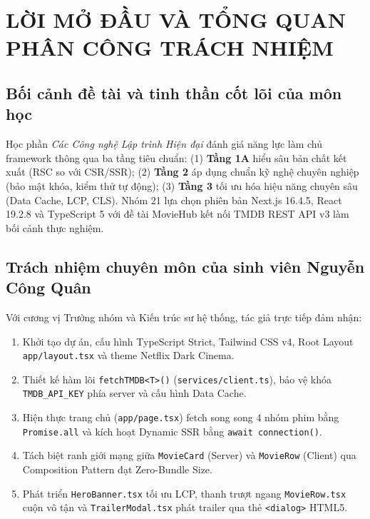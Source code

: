\documentclass[12pt,a4paper]{extarticle}
\begin{document}
\newpage

\section{LỜI MỞ ĐẦU VÀ TỔNG QUAN PHÂN CÔNG TRÁCH NHIỆM}

\subsection{Bối cảnh đề tài và tinh thần cốt lõi của môn học}
Học phần \textit{Các Công nghệ Lập trình Hiện đại} đánh giá năng lực làm chủ framework thông qua ba tầng tiêu chuẩn: (1) \textbf{Tầng 1A} hiểu sâu bản chất kết xuất (RSC so với CSR/SSR); (2) \textbf{Tầng 2} áp dụng chuẩn kỹ nghệ chuyên nghiệp (bảo mật khóa, kiểm thử tự động); (3) \textbf{Tầng 3} tối ưu hóa hiệu năng chuyên sâu (Data Cache, LCP, CLS). Nhóm 21 lựa chọn phiên bản Next.js 16.4.5, React 19.2.8 và TypeScript 5 với đề tài MovieHub kết nối TMDB REST API v3 làm bối cảnh thực nghiệm.

\subsection{Trách nhiệm chuyên môn của sinh viên Nguyễn Công Quân}
Với cương vị Trưởng nhóm và Kiến trúc sư hệ thống, tác giả trực tiếp đảm nhận:
\begin{enumerate}
    \item Khởi tạo dự án, cấu hình TypeScript Strict, Tailwind CSS v4, Root Layout \texttt{app/layout.tsx} và theme Netflix Dark Cinema.
    \item Thiết kế hàm lõi \texttt{fetchTMDB<T>()} (\texttt{services/client.ts}), bảo vệ khóa \texttt{TMDB\_API\_KEY} phía server và cấu hình Data Cache.
    \item Hiện thực trang chủ (\texttt{app/page.tsx}) fetch song song 4 nhóm phim bằng \texttt{Promise.all} và kích hoạt Dynamic SSR bằng \texttt{await connection()}.
    \item Tách biệt ranh giới mạng giữa \texttt{MovieCard} (Server) và \texttt{MovieRow} (Client) qua Composition Pattern đạt Zero-Bundle Size.
    \item Phát triển \texttt{HeroBanner.tsx} tối ưu LCP, thanh trượt ngang \texttt{MovieRow.tsx} cuộn vô tận và \texttt{TrailerModal.tsx} phát trailer qua thẻ \texttt{<dialog>} HTML5.
\end{enumerate}
\end{document}

